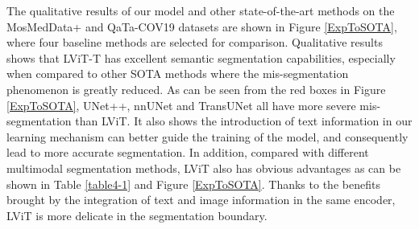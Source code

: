 \documentclass[lettersize,journal]{IEEEtran}
\begin{document}
The qualitative results of our model and other state-of-the-art methods on the MosMedData+ and QaTa-COV19 datasets are shown in Figure \ref{ExpToSOTA}, where four baseline methods are selected for comparison.
Qualitative results shows that LViT-T has excellent semantic segmentation capabilities, especially when compared to other SOTA methods where the mis-segmentation phenomenon is greatly reduced. As can be seen from the red boxes in Figure \ref{ExpToSOTA}, UNet++, nnUNet and TransUNet all have more severe mis-segmentation than LViT. It also shows the introduction of text information in our learning mechanism can better guide the training of the model, and consequently lead to more accurate segmentation. In addition, compared with different multimodal segmentation methods, LViT also has obvious advantages as can be shown in Table \ref{table4-1} and Figure \ref{ExpToSOTA}. Thanks to the benefits brought by the integration of text and image information in the same encoder, LViT is more delicate in the segmentation boundary.

\begin{table*}[!ht]
\caption{Ablation study on different Model Sizes: LViT-T, LViT-S, LViT-B. The Dice and IoU are in
‘mean±std’ format. \textcolor{black}{The std stands for Standard Deviation in three times runs.}}
\label{table4-4}
\centering
{}
\end{table*}
\end{document}
